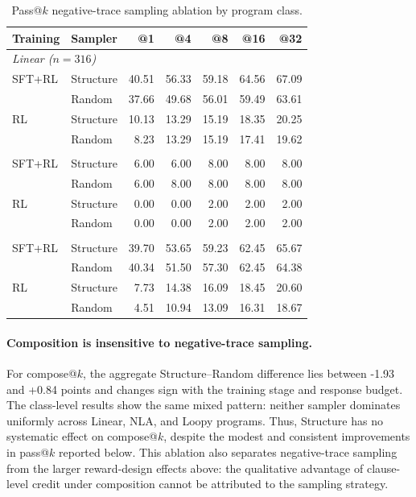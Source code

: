 \documentclass[10pt]{article}
\begin{document}
\begin{table}[htbp]
\centering

\begin{tabular}{llrrrrr}
\toprule
\rowcolor{headerbg}
Training & Sampler & @1 & @4 & @8 & @16 & @32 \\
\midrule
\multicolumn{7}{l}{\textit{Linear ($n=316$)}} \\
SFT+RL & Structure & 40.51 & 56.33 & 59.18 & 64.56 & 67.09 \\
       & Random    & 37.66 & 49.68 & 56.01 & 59.49 & 63.61 \\
RL     & Structure & 10.13 & 13.29 & 15.19 & 18.35 & 20.25 \\
       & Random    & 8.23 & 13.29 & 15.19 & 17.41 & 19.62 \\
\addlinespace
\multicolumn{7}{l}{\textit{NLA ($n=50$)}} \\
SFT+RL & Structure & 6.00 & 6.00 & 8.00 & 8.00 & 8.00 \\
       & Random    & 6.00 & 8.00 & 8.00 & 8.00 & 8.00 \\
RL     & Structure & 0.00 & 0.00 & 2.00 & 2.00 & 2.00 \\
       & Random    & 0.00 & 0.00 & 2.00 & 2.00 & 2.00 \\
\addlinespace
\multicolumn{7}{l}{\textit{Loopy ($n=466$)}} \\
SFT+RL & Structure & 39.70 & 53.65 & 59.23 & 62.45 & 65.67 \\
       & Random    & 40.34 & 51.50 & 57.30 & 62.45 & 64.38 \\
RL     & Structure & 7.73 & 14.38 & 16.09 & 18.45 & 20.60 \\
       & Random    & 4.51 & 10.94 & 13.09 & 16.31 & 18.67 \\
\bottomrule
\end{tabular}
\caption{Pass@\(k\) negative-trace sampling ablation by program class.}
\label{tab:sampler-pass-strata}
\end{table}

\paragraph{Composition is insensitive to negative-trace sampling.}
For compose@\(k\), the aggregate Structure--Random difference lies between
-1.93 and +0.84 points and changes sign with the training stage and response
budget.  The class-level results show the same mixed pattern: neither sampler
dominates uniformly across Linear, NLA, and Loopy programs.  Thus, Structure
has no systematic effect on compose@\(k\), despite the modest and consistent
improvements in pass@\(k\) reported below.  This ablation
also separates negative-trace sampling from the
larger reward-design effects above: the qualitative advantage of clause-level
credit under composition cannot be attributed to the sampling strategy.
\end{document}
